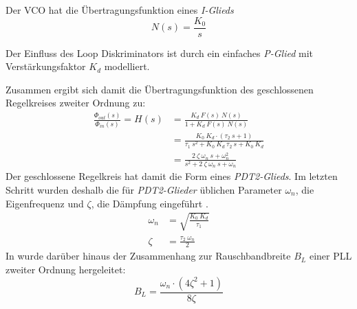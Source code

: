 
Der VCO hat die Übertragungsfunktion eines \emph{I-Glieds} \cite{gardner2005phaselock}
\begin{equation}
    N(s)=\frac{K_0}{s}
\end{equation}

Der Einfluss des Loop Diskriminators ist durch ein einfaches \emph{P-Glied} mit Verstärkungsfaktor $K_d$ modelliert.

Zusammen ergibt sich damit die Übertragungsfunktion des geschlossenen Regelkreises zweiter Ordnung zu:
\begin{align}
    \frac{\Phi_{out}(s)}{\Phi_{in}(s)}=H(s) &= \frac{K_d ~ F(s)~ N(s)}{1+K_d ~ F(s)~ N(s)}\\
         &= \frac{K_0 ~K_d \cdot (\tau_2 ~s + 1)}{\tau_1 ~s^2 + K_0 ~K_d~\tau_2~s+K_0~K_d}\\
         &= \frac{2  ~ \zeta  ~ \omega_n ~ s + \omega_n^2}{s^2 + 2 ~\zeta~\omega_n~s + \omega_n}
\end{align}
Der geschlossene Regelkreis hat damit die Form eines \emph{PDT2-Glieds}. Im letzten Schritt wurden deshalb die für \emph{PDT2-Glieder} üblichen Parameter $\omega_n$, die Eigenfrequenz und $\zeta$, die Dämpfung eingeführt \cite{gardner2005phaselock}.
\begin{align}
    \omega_n &=\sqrt{\frac{K_0~K_d}{\tau_1}} \label{Eq:omegaN}\\
    \zeta &=\frac{\tau_2~\omega_n}{2} \label{Eq:zeta}
\end{align}
In \cite{parkinsonGPS} wurde darüber hinaus der Zusammenhang zur Rauschbandbreite $B_L$ einer PLL zweiter Ordnung hergeleitet:
\begin{equation}
    B_L = \frac{\omega_n \cdot (4\zeta^2+1)}{8\zeta} \label{Eq:NoiseBW}
\end{equation}

